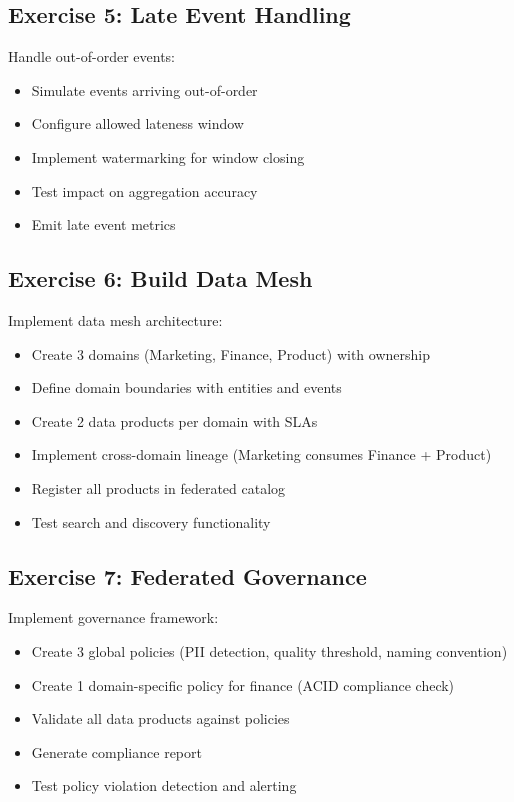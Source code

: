 \subsection{Exercise 5: Late Event Handling}

Handle out-of-order events:
\begin{itemize}
    \item Simulate events arriving out-of-order
    \item Configure allowed lateness window
    \item Implement watermarking for window closing
    \item Test impact on aggregation accuracy
    \item Emit late event metrics
\end{itemize}

\subsection{Exercise 6: Build Data Mesh}

Implement data mesh architecture:
\begin{itemize}
    \item Create 3 domains (Marketing, Finance, Product) with ownership
    \item Define domain boundaries with entities and events
    \item Create 2 data products per domain with SLAs
    \item Implement cross-domain lineage (Marketing consumes Finance + Product)
    \item Register all products in federated catalog
    \item Test search and discovery functionality
\end{itemize}

\subsection{Exercise 7: Federated Governance}

Implement governance framework:
\begin{itemize}
    \item Create 3 global policies (PII detection, quality threshold, naming convention)
    \item Create 1 domain-specific policy for finance (ACID compliance check)
    \item Validate all data products against policies
    \item Generate compliance report
    \item Test policy violation detection and alerting
\end{itemize}


